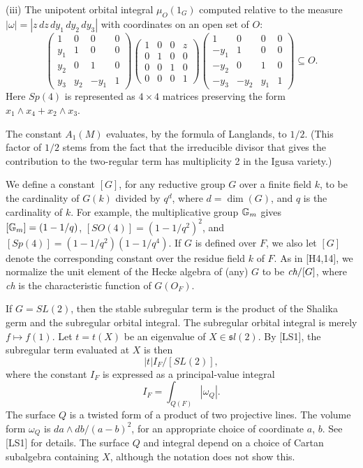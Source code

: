 \documentclass{amsart}
\newcommand\G{{\Bbb G}}
\begin{document}
(iii) The unipotent orbital integral $\mu_O(1_G)$ computed
relative to the measure 
$|\omega|=|z\,dz\,dy_1\,dy_2\,dy_3|$ with coordinates
on an open set of $O$:
\begin{equation}\label{eqn:3}
\begin{pmatrix} 1&0&0&0\\ y_1&1&0&0 \\
          y_2&0&1&0 \\ y_3&y_2&-y_1&1 \end{pmatrix}
\begin{pmatrix} 1&0&0&z\\ 0&1&0&0 \\
          0&0&1&0 \\ 0&0&0&1 \end{pmatrix}
\begin{pmatrix} 1&0&0&0\\ -y_1&1&0&0 \\
          -y_2&0&1&0 \\ -y_3&-y_2&y_1&1 \end{pmatrix}
\subseteq O.
\end{equation}
Here $Sp(4)$ is represented as $4\times4$ matrices preserving
the form $x_1\wedge x_4 + x_2\wedge x_3$.

The constant $A_1(M)$ evaluates, by the
formula of Langlands, to $1/2$.  (This factor of $1/2$
stems from the fact that the irreducible divisor that gives
the contribution to the two-regular term has multiplicity 2 in
the Igusa variety.)

We define a constant $[G]$, for any reductive group $G$ over
a finite field $k$, to be the cardinality of $G(k)$ divided by
$q^d$, where $d = \dim(G)$, and $q$ is the cardinality of $k$.
For example, the multiplicative group $\G_m$
gives $[\G_m] = (1-1/q)$, $[SO(4)] = (1-1/q^2)^2$,
and $[Sp(4)] = (1-1/q^2)(1-1/q^4)$. If $G$ is defined over
$F$, we also let $[G]$ denote the corresponding constant
over the residue field $k$ of $F$.
As in [H4,14], we normalize the unit element of the Hecke
algebra of (any) $G$ 
to be $\text{\it ch}/[G]$, where {\it ch\/} is the
characteristic function of $G(O_F)$.  

If $G = SL(2)$, then
the stable subregular term is the product of the Shalika
germ
and the subregular orbital integral. The subregular
orbital integral is merely
$f\mapsto f(1)$.  Let $t=t(X)$ be an eigenvalue of 
$X\in {\mathfrak sl}(2)$.
By [LS1], the subregular term evaluated at $X$ is then
$$|t|I_F/[SL(2)],$$
where the constant $I_F$ is expressed as a principal-value
integral
$$I_F = \int_{Q(F)} |\omega_Q|.$$
The surface $Q$ is a twisted form of a product of two projective
lines.  The volume form $\omega_Q$ is $da\wedge db/(a-b)^2$, for an
appropriate choice of coordinate $a$, $b$.  See [LS1] for details.
The surface $Q$ and integral depend on a choice of Cartan subalgebra
containing $X$, although the notation does not show this.
\end{document}
